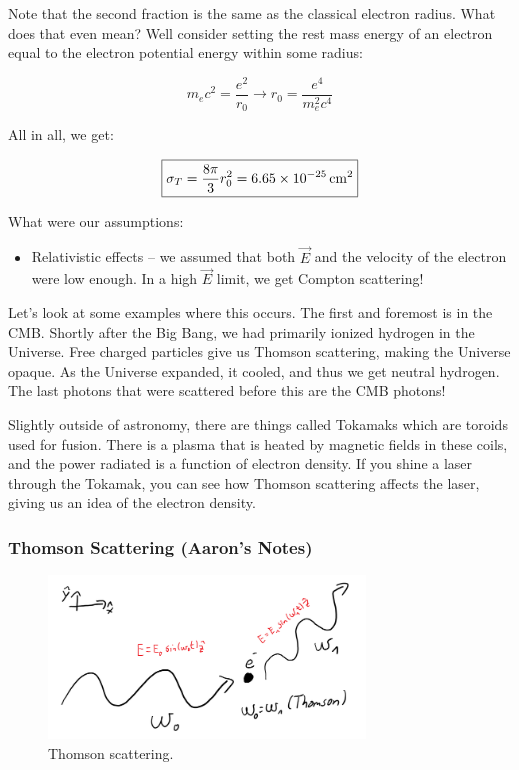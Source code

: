 \documentclass{article}
\newcommand{\unit}[1]{{\,\rm #1}}
\newcommand{\cm}{\unit{cm}}
\def\Efield{{\vec {E}}}
\begin{document}
Note that the second fraction is the same as the classical electron radius. What does that even mean? Well consider setting the rest mass energy of an electron equal to the electron potential energy within some radius:

$$
m_e c^2 = \frac{e^2}{r_0 }\rightarrow r_0 = \frac{e^4}{m_e^2 c^4}
$$

All in all, we get:

$$
\boxed{\sigma_T = \frac{8\pi}{3} r_0^2 = 6.65 \times 10^{-25} \cm^{2}}
$$

What were our assumptions:
\begin{itemize}
    \item Relativistic effects -- we assumed that both $\Efield$ and the velocity of the electron were low enough. In a high $\vec{E}$ limit, we get Compton scattering! 
\end{itemize}

Let's look at some examples where this occurs. The first and foremost is in the CMB. Shortly after the Big Bang, we had primarily ionized hydrogen in the Universe. Free charged particles give us Thomson scattering, making the Universe opaque. As the Universe expanded, it cooled, and thus we get neutral hydrogen. The last photons that were scattered before this are the CMB photons! 

Slightly outside of astronomy, there are things called Tokamaks which are toroids used for fusion. There is a plasma that is heated by magnetic fields in these coils, and the power radiated is a function of electron density. If you shine a laser through the Tokamak, you can see how Thomson scattering affects the laser, giving us an idea of the electron density. 

\subsubsection{Thomson Scattering (Aaron's Notes)}

\begin{figure}
    \centering
    \includegraphics[width=0.75\textwidth]{800px-Thomson.png}
    \caption{Thomson scattering.}
    \label{fig:thomson}
\end{figure}
\end{document}
